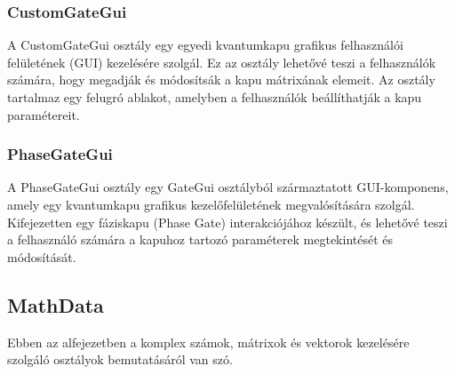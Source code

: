 \documentclass[fontsize=12pt,a4paper]{article}
\begin{document}
\newpage
\subsubsection{CustomGateGui}

A CustomGateGui osztály egy egyedi kvantumkapu grafikus felhasználói felületének (GUI) kezelésére szolgál. Ez az osztály lehetővé teszi a felhasználók számára, hogy megadják és módosítsák a kapu mátrixának elemeit. Az osztály tartalmaz egy felugró ablakot, amelyben a felhasználók beállíthatják a kapu paramétereit.

\begin{table}[h!]
    \centering
\end{table}

\subsubsection{PhaseGateGui}

A PhaseGateGui osztály egy GateGui osztályból származtatott GUI-komponens, amely egy kvantumkapu grafikus kezelőfelületének megvalósítására szolgál. Kifejezetten egy fáziskapu (Phase Gate) interakciójához készült, és lehetővé teszi a felhasználó számára a kapuhoz tartozó paraméterek megtekintését és módosítását.

\begin{table}[h!]
    \centering
\end{table}

\subsection{MathData}

Ebben az alfejezetben a komplex számok, mátrixok és vektorok kezelésére szolgáló osztályok bemutatásáról van szó.
\end{document}
